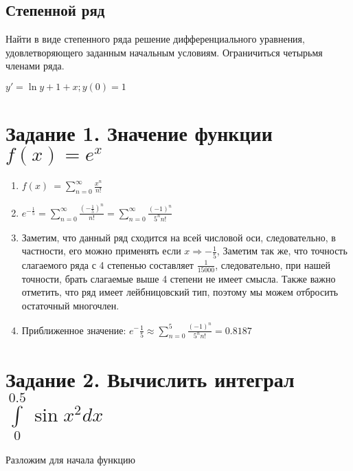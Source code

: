 \documentclass{article}
\renewcommand{\thesubsection}{Задание \arabic{subsection}.}
\begin{document}
\subsection{Степенной ряд}

Найти в виде степенного ряда решение дифференциального уравнения, удовлетворяющего заданным начальным условиям. Ограничиться четырьмя членами ряда. 
\begin{center}
    $y' = \ln{y} + 1 + x; y(0) = 1$
\end{center}

\renewcommand{\thesubsection}{\arabic{subsection}.}


\section{Задание 1. Значение функции $f(x) = e^x$}

\begin{enumerate}
    \item $f\left(x\right)\ =\sum\limits_{n=0}^{\infty}\frac{x^n}{n!}$
    \item $e^{-\frac{1}{5}} = \sum\limits_{n=0}^{\infty}\frac{(-\frac{1}{5})^n}{n!} = \sum\limits_{n=0}^{\infty}\frac{(-1)^n}{5^nn!}$
    \item Заметим, что данный ряд сходится на всей числовой оси, следовательно, в частности, его можно применять если $x \Rightarrow -\frac{1}{5}$, Заметим так же, что точность слагаемого ряда с 4 степенью составляет $\frac{1}{15000}$, следовательно, при нашей точности, брать слагаемые выше 4 степени не имеет смысла. Также важно отметить, что ряд имеет лейбницовский тип, поэтому мы можем отбросить остаточный многочлен.
    \item Приближенное значение: $e^-\frac{1}{5} \approx  \sum\limits_{n=0}^{5}\frac{(-1)^n}{5^nn!} = 0.8187$
\end{enumerate}




\section{Задание 2. Вычислить интеграл $\int\limits_{0}^{0.5} \sin{x^2}dx$}

Разложим для начала функцию
\end{document}
